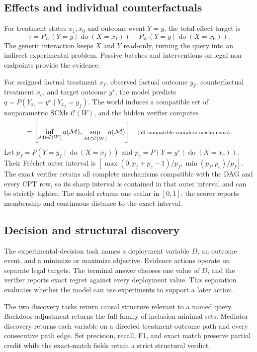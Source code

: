 \documentclass{article}
\newcommand{\doop}{\operatorname{do}}
\newcommand{\compat}{\mathcal{C}}
\begin{document}
\subsection{Effects and individual counterfactuals}

For treatment states $x_1,x_0$ and outcome event $Y=y$, the total-effect target
is
\begin{equation}
  \tau=P_W(Y=y\mid\doop(X=x_1))-P_W(Y=y\mid\doop(X=x_0)).
  \label{eq:ate}
\end{equation}
The generic interaction keeps $X$ and $Y$ read-only, turning the query into an
indirect experimental problem. Passive batches and interventions on legal
non-endpoints provide the evidence.

For assigned factual treatment $x_f$, observed factual outcome $y_f$,
counterfactual treatment $x_c$, and target outcome $y^\star$, the model predicts
$q=P(Y_{x_c}=y^\star\mid Y_{x_f}=y_f)$. The world induces a compatible set of
nonparametric SCMs $\compat(W)$, and the hidden verifier computes
\begin{equation}
  [L,U]=\left[
  \inf_{\mathcal M\in\compat(W)} q(\mathcal M),
  \sup_{\mathcal M\in\compat(W)} q(\mathcal M)
  \right]
  \quad\text{\scriptsize(all compatible complete mechanisms)}.
  \label{eq:cfset}
\end{equation}
Let $p_f=P(Y=y_f\mid\doop(X=x_f))$ and
$p_c=P(Y=y^\star\mid\doop(X=x_c))$. Their Fr\'echet outer interval is
$[\max(0,p_f+p_c-1)/p_f,\min(p_f,p_c)/p_f]$. The exact verifier retains all
complete mechanisms compatible with the DAG and every CPT row, so its sharp
interval is contained in that outer interval and can be strictly tighter. The
model returns one scalar in $[0,1]$; the scorer reports membership and continuous
distance to the exact interval.

\subsection{Decision and structural discovery}

The experimental-decision task names a deployment variable $D$, an outcome event,
and a minimize or maximize objective. Evidence actions operate on separate legal
targets. The terminal answer chooses one value of $D$, and the verifier reports
exact regret against every deployment value. This separation evaluates whether
the model can use experiments to support a later action.

The two discovery tasks return causal structure relevant to a named query.
Backdoor adjustment returns the full family of inclusion-minimal sets. Mediator
discovery returns each variable on a directed treatment-outcome path and every
consecutive path edge. Set precision, recall, F1, and exact match preserve partial
credit while the exact-match fields retain a strict structural verdict.
\end{document}
